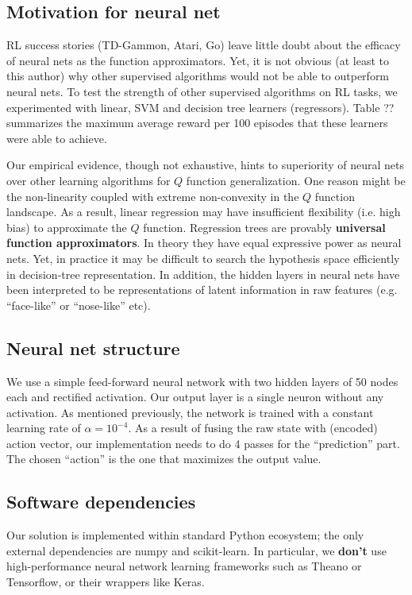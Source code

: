 \documentclass[conference]{IEEEtran}
\begin{document}
\subsection{Motivation for neural net}
RL success stories (TD-Gammon, Atari, Go) leave little doubt about the efficacy of neural nets as the function approximators. Yet, it is not obvious (at least to this author) why other supervised algorithms would not be able to outperform neural nets. To test the strength of other supervised algorithms on RL tasks, we experimented with linear, SVM and decision tree learners (regressors). Table ?? summarizes the maximum average reward per 100 episodes that these learners were able to achieve. 

Our empirical evidence, though not exhaustive, hints to superiority of neural nets over other learning algorithms for $Q$ function generalization. One reason might be the non-linearity coupled with extreme non-convexity in the $Q$ function landscape. As a result, linear regression may have insufficient flexibility (i.e. high bias) to approximate the $Q$ function. Regression trees are provably {\bf universal function approximators}. In theory they have equal expressive power as neural nets. Yet, in practice it may be difficult to search the hypothesis space efficiently in decision-tree representation. In addition, the hidden layers in neural nets have been interpreted to be representations of latent information in raw features (e.g. ``face-like'' or ``nose-like'' etc).
\subsection{Neural net structure}
We use a simple feed-forward neural network with two hidden layers of 50 nodes each and rectified activation. Our output layer is a single neuron without any activation. As mentioned previously, the network is trained with a constant learning rate of $\alpha=10^{-4}$. As a result of fusing the raw state with (encoded) action vector, our implementation needs to do 4 passes for the ``prediction'' part. The chosen ``action'' is the one that maximizes the output value.
\subsection{Software dependencies}
Our solution is implemented within standard Python ecosystem; the only external dependencies are numpy and scikit-learn. In particular, we {\bf don't} use high-performance neural network learning frameworks such as Theano or Tensorflow, or their wrappers like Keras. 
\end{document}
